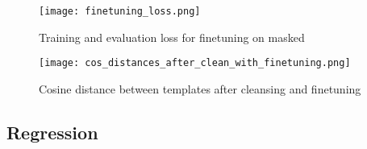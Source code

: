 \begin{figure}[h]
  \centering
  \texttt{[image: finetuning\_loss.png]}\\
  \caption{Training and evaluation loss for finetuning on masked }
  \label{fig:finetuning_loss}
\end{figure}

\begin{figure}[h]
  \centering
  \texttt{[image: cos\_distances\_after\_clean\_with\_finetuning.png]}\\
  \caption{Cosine distance between templates after cleansing and finetuning}
  \label{fig:cos_distance_finetuning}
\end{figure}


\subsection{Regression}
